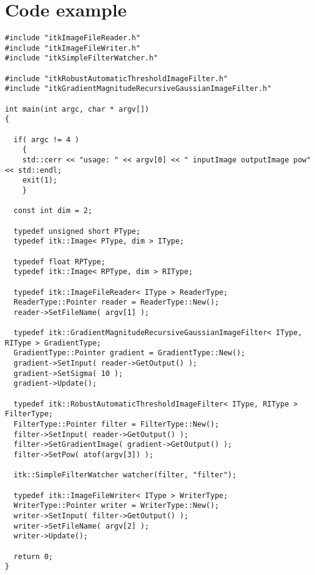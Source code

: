\documentclass{InsightArticle}
\begin{document}
\section{Code example}

\small \begin{verbatim}
#include "itkImageFileReader.h"
#include "itkImageFileWriter.h"
#include "itkSimpleFilterWatcher.h"

#include "itkRobustAutomaticThresholdImageFilter.h"
#include "itkGradientMagnitudeRecursiveGaussianImageFilter.h"

int main(int argc, char * argv[])
{

  if( argc != 4 )
    {
    std::cerr << "usage: " << argv[0] << " inputImage outputImage pow" << std::endl;
    exit(1);
    }

  const int dim = 2;
  
  typedef unsigned short PType;
  typedef itk::Image< PType, dim > IType;

  typedef float RPType;
  typedef itk::Image< RPType, dim > RIType;

  typedef itk::ImageFileReader< IType > ReaderType;
  ReaderType::Pointer reader = ReaderType::New();
  reader->SetFileName( argv[1] );
  
  typedef itk::GradientMagnitudeRecursiveGaussianImageFilter< IType, RIType > GradientType;
  GradientType::Pointer gradient = GradientType::New();
  gradient->SetInput( reader->GetOutput() );
  gradient->SetSigma( 10 );
  gradient->Update();

  typedef itk::RobustAutomaticThresholdImageFilter< IType, RIType > FilterType;
  FilterType::Pointer filter = FilterType::New();
  filter->SetInput( reader->GetOutput() );
  filter->SetGradientImage( gradient->GetOutput() );
  filter->SetPow( atof(argv[3]) );

  itk::SimpleFilterWatcher watcher(filter, "filter");

  typedef itk::ImageFileWriter< IType > WriterType;
  WriterType::Pointer writer = WriterType::New();
  writer->SetInput( filter->GetOutput() );
  writer->SetFileName( argv[2] );
  writer->Update();

  return 0;
}
\end{verbatim} \normalsize

\end{document}
